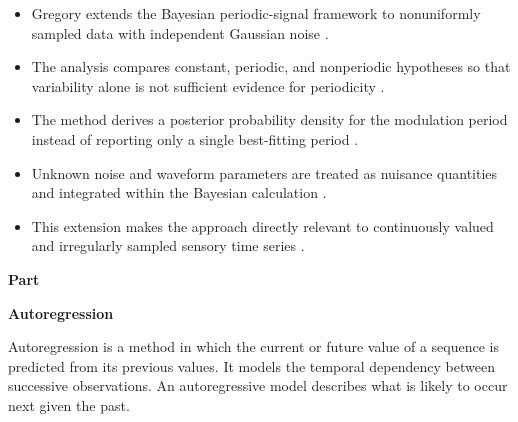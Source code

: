 \documentclass{book}
\providecommand{\ProjectDeepHeading}[2]{%
    \par\medskip\noindent\textbf{#2}\par\smallskip
}
\begin{document}
\begin{itemize}

    \item Gregory extends the Bayesian periodic-signal framework to nonuniformly sampled data with independent Gaussian noise \citep{gregory-1999-bayesian-periodic-signal-detection-i-analysis-of-20-years-of-radio-flux-measurements-of-the-x-ray-binary-ls-i-plus-61-303}.

    \item The analysis compares constant, periodic, and nonperiodic hypotheses so that variability alone is not sufficient evidence for periodicity \citep{gregory-1999-bayesian-periodic-signal-detection-i-analysis-of-20-years-of-radio-flux-measurements-of-the-x-ray-binary-ls-i-plus-61-303}.

    \item The method derives a posterior probability density for the modulation period instead of reporting only a single best-fitting period \citep{gregory-1999-bayesian-periodic-signal-detection-i-analysis-of-20-years-of-radio-flux-measurements-of-the-x-ray-binary-ls-i-plus-61-303}.

    \item Unknown noise and waveform parameters are treated as nuisance quantities and integrated within the Bayesian calculation \citep{gregory-1999-bayesian-periodic-signal-detection-i-analysis-of-20-years-of-radio-flux-measurements-of-the-x-ray-binary-ls-i-plus-61-303}.

    \item This extension makes the approach directly relevant to continuously valued and irregularly sampled sensory time series \citep{gregory-1999-bayesian-periodic-signal-detection-i-analysis-of-20-years-of-radio-flux-measurements-of-the-x-ray-binary-ls-i-plus-61-303}.

\end{itemize}

\ProjectDeepHeading{1}{Part}

\ProjectDeepHeading{2}{Autoregression}


Autoregression is a method in which the current or future value of a sequence is predicted from its previous values. It models the temporal dependency between successive observations. An autoregressive model describes what is likely to occur next given the past.
\end{document}
